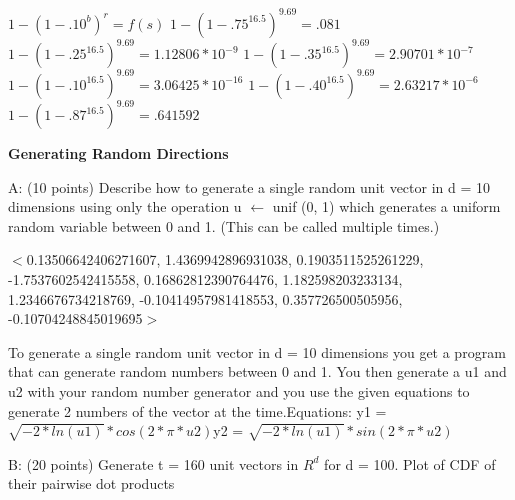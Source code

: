 \documentclass{report}
\begin{document}
\begin{flushleft}
${1 - (1 - .10^{b})^{r} = f(s)}$ \newline
${1 - (1 - .75^{16.5})^{9.69} = .081}$\newline
${1 - (1 - .25^{16.5})^{9.69} = 1.12806 * 10^{-9}}$ \newline
${1 - (1 - .35^{16.5})^{9.69} = 2.90701 * 10^{-7}}$ \newline
${1 - (1 - .10^{16.5})^{9.69} = 3.06425 * 10^{-16}}$ \newline
${1 - (1 - .40^{16.5})^{9.69} = 2.63217 * 10^{-6}}$ \newline
${1 - (1 - .87^{16.5})^{9.69} = .641592}$
\end{flushleft}

 
 \begin{center}
 \textbf{Generating Random Directions}
\end{center}

\begin{center}
A: (10 points) Describe how to generate a single random unit vector in d = 10 dimensions using only the operation u  ${\leftarrow} $ unif (0, 1) which generates a uniform random variable between 0 and 1. (This can be called multiple times.)
\end{center}

\begin{center}
${<}$0.13506642406271607, 1.4369942896931038, 0.1903511525261229, -1.7537602542415558, 0.16862812390764476, 1.182598203233134, 1.2346676734218769, -0.10414957981418553, 0.357726500505956, -0.10704248845019695${>}$
\end{center}

\begin{center}
To generate a single random unit vector in d = 10 dimensions you get a program that can generate random numbers between 0 and 1. You then generate a u1 and u2 with your random number generator and you use the given equations to generate 2 numbers of the vector at the time.\newline Equations: y1 = $\sqrt{-2*ln(u1)}*cos(2*\pi*u2)$\newline y2 = $\sqrt{-2*ln(u1)}*sin(2*\pi*u2)$
\end{center}

\begin{center}
B: (20 points) Generate t = 160 unit vectors in ${R^d}$ for d = 100. Plot of CDF of their pairwise dot products
\end{center}
\end{document}
